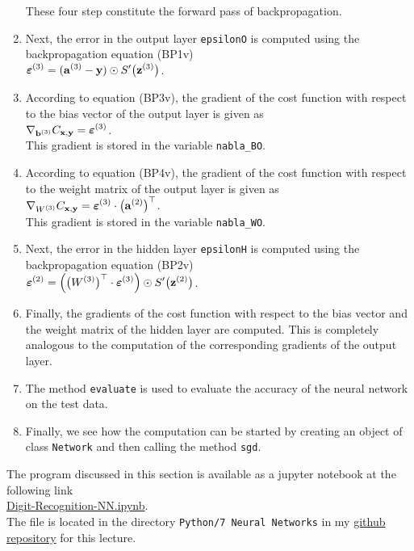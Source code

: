 \begin{enumerate}
      These four step constitute the forward pass of backpropagation.
\item Next, the error in the output layer \texttt{epsilonO} is computed using the backpropagation equation
      (BP1v)
      \\[0.2cm]
      \hspace*{1.3cm}
      $\displaystyle \boldsymbol{\varepsilon}^{(3)} = (\mathbf{a}^{(3)} - \mathbf{y}) \odot S'\bigl(\mathbf{z}^{(3)}\bigr)$.
\item According to  equation (BP3v), the gradient of the cost function with respect to the bias vector of the
      output layer is given as
      \\[0.2cm]
      \hspace*{1.3cm}
      $\displaystyle \nabla_{\mathbf{b}^{(3)}} C_{\mathbf{x}, \mathbf{y}} = \boldsymbol{\varepsilon}^{(3)}$.
      \\[0.2cm]
      This gradient is stored in the variable \texttt{nabla\_BO}.
\item According to equation (BP4v), the gradient  of the cost function with respect to the weight matrix of the
      output layer is given as
      \\[0.2cm]
      \hspace*{1.3cm}
      $\displaystyle \nabla_{W^{(3)}} C_{\mathbf{x}, \mathbf{y}} = \boldsymbol{\varepsilon}^{(3)} \cdot \bigl(\mathbf{a}^{(2)}\bigr)^\top$.
      \\[0.2cm]
      This gradient is stored in the variable \texttt{nabla\_WO}.
\item Next, the error in the hidden layer \texttt{epsilonH} is computed using the backpropagation equation
      (BP2v)
      \\[0.2cm]
      \hspace*{1.3cm}
      $\displaystyle \boldsymbol{\varepsilon}^{(2)} = \Bigl(\bigl(W^{(3)}\bigr)^\top \cdot \boldsymbol{\varepsilon}^{(3)}\Bigr) \odot
           S'\bigl(\mathbf{z}^{(2)}\bigr)
      $.
\item Finally, the gradients of the cost function with respect to the bias
      vector and the weight matrix of the hidden layer are computed.  This is completely analogous to the computation of
      the corresponding gradients of the output layer.
\item The method \texttt{evaluate} is used to evaluate the accuracy of the neural network on the test data.
\item Finally, we see how the computation can be started by creating an object of class \texttt{Network} and
      then calling the method \texttt{sgd}.
\end{enumerate}
The program discussed in this section is available as a jupyter notebook at the following link
\\[0.2cm]
\hspace*{1.3cm}
\href{https://github.com/karlstroetmann/Artificial-Intelligence/blob/master/Python/7%20Neural%20Networks/Digit-Recognition-NN.ipynb}{Digit-Recognition-NN.ipynb}.
\\[0.2cm]
The file is located in the directory \texttt{Python/7 Neural Networks} in my
\href{https://github.com/karlstroetmann/Artificial-Intelligence}{github repository} for this lecture. 

